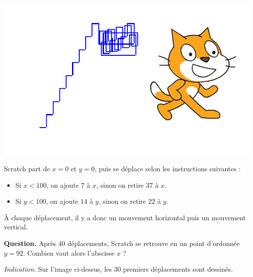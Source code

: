 \documentclass[class=report,crop=false, 12pt]{standalone}
\begin{document}
\begin{enigme}

\sauteligne

\begin{center}
  \includegraphics[scale=\scaleecran]{ecran-07-eg3-new} 
\end{center}


Scratch part de $x=0$ et $y=0$, puis se déplace selon les instructions suivantes :
\begin{itemize}
  \item Si $x < 100$, on ajoute $7$ à $x$, sinon on retire $37$ à $x$.

  \item Si $y<100$, on ajoute $14$ à $y$, sinon on retire $22$ à $y$.
\end{itemize}

À chaque déplacement, il y a donc un mouvement horizontal puis un mouvement vertical.



\bigskip

\textbf{Question.}  Après $40$ déplacements, Scratch se retrouve en un point d'ordonnée $y=92$. Combien vaut alors l'abscisse $x$ ?

\bigskip

\emph{Indication.} Sur l'image ci-dessus, les $30$ premiers déplacements sont dessinés.



\end{enigme}
\end{document}

